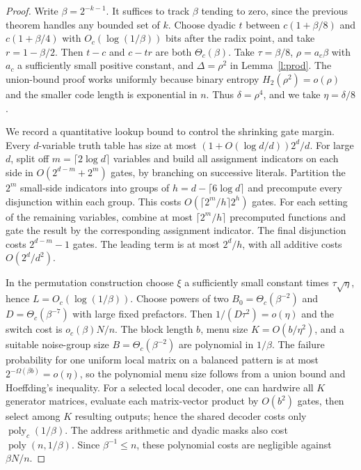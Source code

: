 \documentclass[11pt]{article}
\begin{document}
\begin{proof}
Write $\beta=2^{-k-1}$. It suffices to track $\beta$ tending to zero, since the previous theorem handles any bounded set of $k$. Choose dyadic $t$ between $c(1+\beta/8)$ and $c(1+\beta/4)$ with $O_c(\log(1/\beta))$ bits after the radix point, and take $r=1-\beta/2$. Then $t-c$ and $c-tr$ are both $\Theta_c(\beta)$. Take $\tau=\beta/8$, $\rho=a_c\beta$ with $a_c$ a sufficiently small positive constant, and $\Delta=\rho^2$ in Lemma~\ref{l:prod}. The union-bound proof works uniformly because binary entropy $H_2(\rho^2)=o(\rho)$ and the smaller code length is exponential in $n$. Thus $\delta=\rho^4$, and we take $\eta=\delta/8$.

We record a quantitative lookup bound to control the shrinking gate margin. Every $d$-variable truth table has size at most $(1+O(\log d/d))2^d/d$. For large $d$, split off $m=\lceil2\log d\rceil$ variables and build all assignment indicators on each side in $O(2^{d-m}+2^m)$ gates, by branching on successive literals. Partition the $2^m$ small-side indicators into groups of $h=d-\lceil6\log d\rceil$ and precompute every disjunction within each group. This costs $O(\lceil2^m/h\rceil2^h)$ gates. For each setting of the remaining variables, combine at most $\lceil2^m/h\rceil$ precomputed functions and gate the result by the corresponding assignment indicator. The final disjunction costs $2^{d-m}-1$ gates. The leading term is at most $2^d/h$, with all additive costs $O(2^d/d^2)$.

In the permutation construction choose $\xi$ a sufficiently small constant times $\tau\sqrt\eta$, hence $L=O_c(\log(1/\beta))$. Choose powers of two $B_0=\Theta_c(\beta^{-2})$ and $D=\Theta_c(\beta^{-7})$ with large fixed prefactors. Then $1/(D\tau^2)=o(\eta)$ and the switch cost is $o_c(\beta)N/n$. The block length $b$, menu size $K=O(b/\eta^2)$, and a suitable noise-group size $B=\Theta_c(\beta^{-2})$ are polynomial in $1/\beta$. The failure probability for one uniform local matrix on a balanced pattern is at most $2^{-\Omega(\beta b)}=o(\eta)$, so the polynomial menu size follows from a union bound and Hoeffding's inequality. For a selected local decoder, one can hardwire all $K$ generator matrices, evaluate each matrix-vector product by $O(b^2)$ gates, then select among $K$ resulting outputs; hence the shared decoder costs only $\operatorname{poly}_c(1/\beta)$. The address arithmetic and dyadic masks also cost $\operatorname{poly}(n,1/\beta)$. Since $\beta^{-1}\le n$, these polynomial costs are negligible against $\beta N/n$.


\end{proof}
\end{document}
